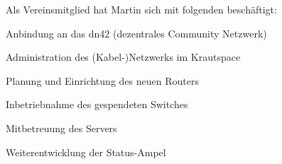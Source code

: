 \documentclass[ngerman]{scrartcl}
\begin{document}
Als Vereinsmitglied hat Martin sich mit folgenden beschäftigt: 
\begin{compactitem}
	\item Anbindung an das dn42 (dezentrales Community Netzwerk)
	\item Administration des (Kabel-)Netzwerks im Krautspace
	\item Planung und Einrichtung des neuen Routers
	\item Inbetriebnahme des gespendeten Switches
	\item Mitbetreuung des Servers
	\item Weiterentwicklung der Status-Ampel
\end{compactitem}
\end{document}
